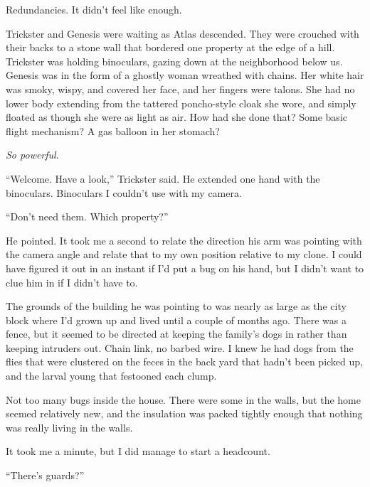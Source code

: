 Redundancies.  It didn't feel like enough.



Trickster and Genesis were waiting as Atlas descended.  They were crouched with their backs to a stone wall that bordered one property at the edge of a hill.  Trickster was holding binoculars, gazing down at the neighborhood below us.  Genesis was in the form of a ghostly woman wreathed with chains.  Her white hair was smoky, wispy, and covered her face, and her fingers were talons.  She had no lower body extending from the tattered poncho-style cloak she wore, and simply floated as though she were as light as air.  How had she done that?  Some basic flight mechanism?  A gas balloon in her stomach?



\emph{So powerful}.



``Welcome.  Have a look,'' Trickster said.  He extended one hand with the binoculars.  Binoculars I couldn't use with my camera.



``Don't need them.  Which property?''



He pointed.  It took me a second to relate the direction his arm was pointing with the camera angle and relate that to my own position relative to my clone.  I could have figured it out in an instant if I'd put a bug on his hand, but I didn't want to clue him in if I didn't have to.



The grounds of the building he was pointing to was nearly as large as the city block where I'd grown up and lived until a couple of months ago.  There was a fence, but it seemed to be directed at keeping the family's dogs in rather than keeping intruders out.  Chain link, no barbed wire.  I knew he had dogs from the flies that were clustered on the feces in the back yard that hadn't been picked up, and the larval young that festooned each clump.



Not too many bugs inside the house.  There were some in the walls, but the home seemed relatively new, and the insulation was packed tightly enough that nothing was really living in the walls.



It took me a minute, but I did manage to start a headcount.



``There's guards?''



